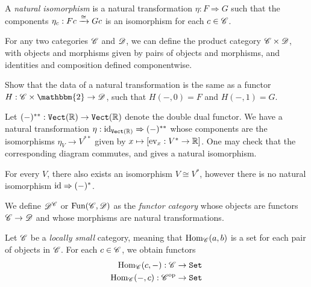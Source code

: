 \documentclass{article}[11pt]
\begin{document}
\begin{definition} A \textit{natural isomorphism} is a natural transformation $\eta: F \Rightarrow G$ such that the components $\eta_c : Fc \xrightarrow{\cong} Gc$ is an isomorphism for each $c\in \mathscr{C}$.
\end{definition}


For any two categories $\mathscr{C}$ and $\mathscr{D}$, we can define the product category $\mathscr{C}\times \mathscr{D}$, with objects and morphisms given by pairs of objects and morphisms, and identities and composition defined componentwise. 

\begin{exercise} Show that the data of a natural transformation is the same as a functor $H : \C\times\mathbbm{2} \to \D$, such that $H(-,0)=F$ and $H(-,1) = G$. 
\end{exercise}


\begin{example} Let $(-)^{\ast\ast} : \texttt{Vect}(\mathbb{R}) \to \texttt{Vect}(\mathbb{R})$ denote the double dual functor. We have a natural transformation $\eta : \text{id}_{\texttt{Vect}(\mathbb{R})} \Rightarrow (-)^{\ast\ast}$ whose components are the isomorphisms $\eta_V \to V^{\ast\ast}$ given by $x\mapsto [\text{ev}_x : V^\ast \to \mathbb{R}]$. One may check that the corresponding diagram commutes, and gives a natural isomorphism.
\end{example}


\begin{remark} For every $V$, there also exists an isomorphism $V\cong V^\ast$, however there is no natural isomorphism $\text{id} \Rightarrow (-)^\ast$.
\end{remark}

\begin{definition} We define $\mathscr{D}^{\mathscr{C}}$ or $\text{Fun}(\mathscr{C},\mathscr{D})$ as the \textit{functor category} whose objects are functors $\mathscr{C}\to \mathscr{D}$ and whose morphisms are natural transformations.
\end{definition}

Let $\mathscr{C}$ be a \textit{locally small} category, meaning that $\textup{Hom}_{\mathscr{C}}(a,b)$ is a set for each pair of objects in $\mathscr{C}$. For each $c\in \mathscr{C}$, we obtain functors
\begin{align*}
	\textup{Hom}_{\mathscr{C}} (c,-) : \mathscr{C} &\to \texttt{Set} \\
	\textup{Hom}_{\mathscr{C}}(-,c) : \mathscr{C}^{\text{op}} &\to \texttt{Set}
\end{align*}
\end{document}
